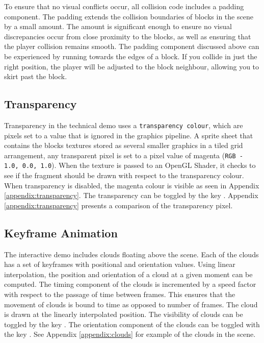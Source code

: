 \documentclass[a4paper,11pt,titlepage]{scrartcl}
\begin{document}
To ensure that no visual conflicts occur, all collision code includes a padding component.  The padding extends the collision boundaries of blocks in the scene by a small amount.   The amount is significant enough to ensure no visual discrepancies occur from close proximity to the blocks, as well as ensuring that the player collision remains smooth.  The padding component discussed above can be experienced by running towards the edges of a block.  If you collide in just the right position, the player will be adjusted to the block neighbour, allowing you to skirt past the block.
   
\subsection{Transparency}
Transparency in the technical demo uses a \texttt{transparency colour}, which are pixels set to a value that is ignored in the graphics pipeline.  A sprite sheet that contains the blocks textures stored as several smaller graphics in a tiled grid arrangement, any transparent pixel is set to a pixel value of magenta (\texttt{RGB - 1.0, 0.0, 1.0}).  When the texture is passed to an OpenGL Shader, it checks to see if the fragment should be drawn with respect to the transparency colour.  When transparency is disabled, the magenta colour is visible as seen in Appendix \ref{appendix:transparency}.
\vskip 2.5mm\noindent
The transparency can be toggled by the key .  Appendix \ref{appendix:transparency} presents a comparison of the transparency pixel.
    
\subsection{Keyframe Animation}
The interactive demo includes clouds floating above the scene.  Each of the clouds has a set of keyframes with positional and orientation values.  Using linear interpolation, the position and orientation of a cloud at a given moment can be computed.  The timing component of the clouds is incremented by a speed factor with respect to the passage of time between frames.  This ensures that the movement of clouds is bound to time as opposed to number of frames.  The cloud is drawn at the linearly interpolated position.
\vskip 2.5mm\noindent
The visibility of clouds can be toggled by the key .  The orientation component of the clouds can be toggled with the key .  See Appendix \ref{appendix:clouds} for example of the clouds in the scene.
\end{document}
